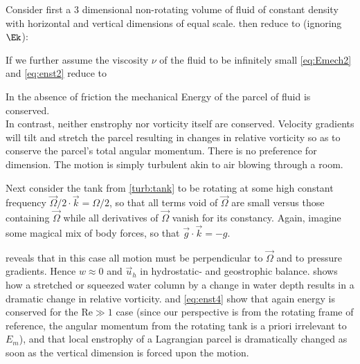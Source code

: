 \begin{turbu}\label{turb:tank}
 Consider first a 3 dimensional non-rotating volume of fluid of constant density with horizontal and vertical dimensions of equal scale.
  then reduce to (ignoring $\Ek$):

If we further assume the viscosity $\nu$ of the fluid to be infinitely small \eqref{eq:Emech2} and \eqref{eq:enst2} reduce to

In the absence of friction the mechanical Energy of the parcel of fluid is conserved.\\
In contrast, neither enstrophy nor vorticity itself are conserved.
Velocity gradients will tilt and stretch the parcel resulting in
changes in relative vorticity so as to conserve the parcel's total
angular momentum. There is no preference for dimension. The motion is
simply turbulent akin to air blowing through a room.
\end{turbu}
\begin{turbu}\label{turb:rottank}
Next consider the tank from \ref{turb:tank} to be rotating at some
high constant frequency $ \vec{\Omega}/2 \cdot \vec{k}=\Omega/2$, so that all
terms void of $\vec{\Omega}$ are small versus those containing
$\vec{\Omega}$ while all derivatives of $\vec{\Omega}$ vanish for its
constancy. Again, imagine
some magical mix of body forces, so that $\vec{g}\cdot \vec{k}=-g$.

 reveals that in this case all motion must be perpendicular to $\vec{\Omega}$ and to pressure gradients. Hence $w \approx 0$ and $\vec{u}_{h}$ in
hydrostatic- and geostrophic balance.  shows how a stretched or squeezed water column by \eg a change in water depth results in a dramatic change
in relative vorticity.   and \eqref{eq:enst4} show that again energy is conserved for the  $\mathrm{Re} \gg 1$ case (since our perspective is from
the rotating frame of reference, the angular momentum from the rotating tank is a priori irrelevant to $E_{m}$), and that local enstrophy of a Lagrangian parcel
is dramatically changed as soon as the vertical dimension is forced upon the motion.\\
\end{turbu}
